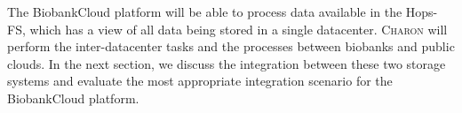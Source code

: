 The BiobankCloud platform will be able to process data available in the Hops-FS, which has a view of all data being stored in a single datacenter.
\textsc{Charon} will perform the inter-datacenter tasks and the processes between biobanks and public clouds.
In the next section, we discuss the integration between these two storage systems and evaluate the most appropriate integration scenario for the BiobankCloud platform.

